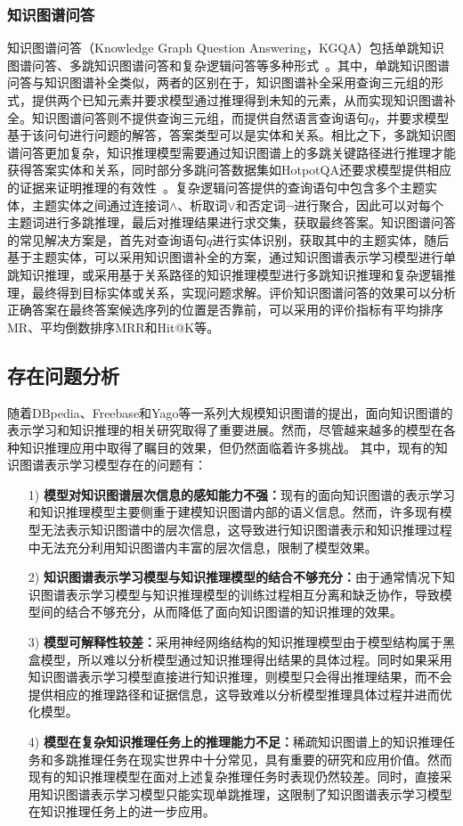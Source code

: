 \documentclass[algorithmlist, AutoFakeBold, AutoFakeSlant, figurelist, tablelist, nomlist, engineering]{seuthesix}
\begin{document}
\subsubsection{知识图谱问答}
知识图谱问答（Knowledge Graph Question Answering，KGQA）包括单跳知识图谱问答、多跳知识图谱问答和复杂逻辑问答等多种形式~\cite{saxena2020improving}。其中，单跳知识图谱问答与知识图谱补全类似，两者的区别在于，知识图谱补全采用查询三元组的形式，提供两个已知元素并要求模型通过推理得到未知的元素，从而实现知识图谱补全。知识图谱问答则不提供查询三元组，而提供自然语言查询语句$q$，并要求模型基于该问句进行问题的解答，答案类型可以是实体和关系。相比之下，多跳知识图谱问答更加复杂，知识推理模型需要通过知识图谱上的多跳关键路径进行推理才能获得答案实体和关系，同时部分多跳问答数据集如HotpotQA还要求模型提供相应的证据来证明推理的有效性~\cite{yang2018hotpotqa}。复杂逻辑问答提供的查询语句中包含多个主题实体，主题实体之间通过连接词$\land$、析取词$\vee$和否定词$\neg$进行聚合，因此可以对每个主题词进行多跳推理，最后对推理结果进行求交集，获取最终答案。知识图谱问答的常见解决方案是，首先对查询语句$q$进行实体识别，获取其中的主题实体，随后基于主题实体，可以采用知识图谱补全的方案，通过知识图谱表示学习模型进行单跳知识推理，或采用基于关系路径的知识推理模型进行多跳知识推理和复杂逻辑推理，最终得到目标实体或关系，实现问题求解。评价知识图谱问答的效果可以分析正确答案在最终答案候选序列的位置是否靠前，可以采用的评价指标有平均排序MR、平均倒数排序MRR和Hit@K等。


\subsection{存在问题分析}
随着DBpedia、Freebase和Yago等一系列大规模知识图谱的提出，面向知识图谱的表示学习和知识推理的相关研究取得了重要进展。然而，尽管越来越多的模型在各种知识推理应用中取得了瞩目的效果，但仍然面临着许多挑战。
其中，现有的知识图谱表示学习模型存在的问题有：
\begin{itemize}
  \item [1)]\textbf{模型对知识图谱层次信息的感知能力不强：}现有的面向知识图谱的表示学习和知识推理模型主要侧重于建模知识图谱内部的语义信息。然而，许多现有模型无法表示知识图谱中的层次信息，这导致进行知识图谱表示和知识推理过程中无法充分利用知识图谱内丰富的层次信息，限制了模型效果。
  \item [2)]\textbf{知识图谱表示学习模型与知识推理模型的结合不够充分：}由于通常情况下知识图谱表示学习模型与知识推理模型的训练过程相互分离和缺乏协作，导致模型间的结合不够充分，从而降低了面向知识图谱的知识推理的效果。
  \item [3)]\textbf{模型可解释性较差：}采用神经网络结构的知识推理模型由于模型结构属于黑盒模型，所以难以分析模型通过知识推理得出结果的具体过程。同时如果采用知识图谱表示学习模型直接进行知识推理，则模型只会得出推理结果，而不会提供相应的推理路径和证据信息，这导致难以分析模型推理具体过程并进而优化模型。
  \item [4)]\textbf{模型在复杂知识推理任务上的推理能力不足：}稀疏知识图谱上的知识推理任务和多跳推理任务在现实世界中十分常见，具有重要的研究和应用价值。然而现有的知识推理模型在面对上述复杂推理任务时表现仍然较差。同时，直接采用知识图谱表示学习模型只能实现单跳推理，这限制了知识图谱表示学习模型在知识推理任务上的进一步应用。
\end{itemize}
\end{document}
